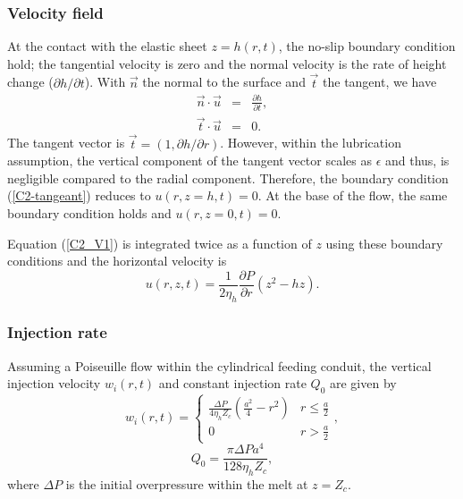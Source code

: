 \subsubsection*{Velocity field}

At the contact with the elastic sheet $z=h(r,t)$, the no-slip boundary
condition  hold;  the  tangential  velocity is  zero  and  the  normal
velocity  is the  rate of  height change  ($\partial h/  \partial t$).
With $\vec{n}$ the normal to the surface and $\vec{t}$ the tangent, we
have
\begin{eqnarray}
  \vec{n} \cdot \vec{u} &=& \frac{\partial h }{\partial t},\\
  \vec{t} \cdot \vec{u} &=& 0. \label{C2-tangeant}
\end{eqnarray}
The  tangent  vector is  $\vec{t}  =  (1,  \partial h/  \partial  r)$.
However, within the lubrication  assumption, the vertical component of
the  tangent  vector scales  as  $\epsilon$  and thus,  is  negligible
compared to  the radial  component. Therefore, the  boundary condition
(\ref{C2-tangeant}) reduces  to $u(r,z=h,t) =0$.   At the base  of the
flow, the same boundary condition holds and $u(r,z=0,t) =0$.

Equation (\ref{C2_V1}) is integrated twice  as a function of $z$ using
these boundary conditions and the horizontal velocity is
\begin{equation}
  u(r,z,t) =\frac{1}{2\eta_h} \frac{\partial P}{\partial r} \left(z^2-hz\right).
  \label{C2-vel}
\end{equation}

\subsubsection*{Injection rate}

Assuming a Poiseuille flow within the cylindrical feeding conduit, the
vertical  injection velocity  $w_i(r,t)$ and  constant injection  rate
$Q_0$ are given by
\begin{equation}
  w_i(r,t)=
  \begin{cases}
    \frac{ \Delta P}{4 \eta_h Z_{c}} (\frac{a^{2}}{4}-r^{2})& r \le \frac{a}{2}\\
    0 & r > \frac{a}{2}
  \end{cases},
  \label{C2-eq12}
\end{equation}
\begin{equation}
  Q_{0}=\frac{\pi \Delta P a^{4}}{128 \eta_h Z_c},
  \label{C2-eq11}
\end{equation}
where  $\Delta P$  is  the  initial overpressure  within  the melt  at
$z=Z_{c}$.

